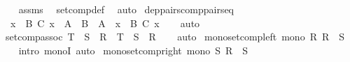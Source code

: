 \begin{isabellebody}
%
\isadelimproof
\ \ %
\endisadelimproof
%
\isatagproof
{}\isamarkupfalse%
\ assms\ \isamarkupfalse%
\ set{\isacharunderscore}{\kern0pt}comp{\isacharunderscore}{\kern0pt}def\ \isamarkupfalse%
\ auto%
\endisatagproof
{\isafoldproof}%
%
\isadelimproof
\isanewline
%
\endisadelimproof
\isanewline
{}\isamarkupfalse%
\ dep{\isacharunderscore}{\kern0pt}pairs{\isacharunderscore}{\kern0pt}comp{\isacharunderscore}{\kern0pt}pairs{\isacharunderscore}{\kern0pt}eq{\isacharcolon}{\kern0pt}\isanewline
\ \ {\isachardoublequoteopen}{\isacharparenleft}{\kern0pt}{\isacharparenleft}{\kern0pt}{\isasymSum}x\ {\isasymin}\ B{\isachardot}{\kern0pt}\ {\isacharparenleft}{\kern0pt}C\ x{\isacharparenright}{\kern0pt}{\isacharparenright}{\kern0pt}\ {\isasymcirc}\ {\isacharparenleft}{\kern0pt}A\ {\isasymtimes}\ B{\isacharparenright}{\kern0pt}{\isacharparenright}{\kern0pt}\ {\isacharequal}{\kern0pt}\ A\ {\isasymtimes}\ {\isacharparenleft}{\kern0pt}{\isasymUnion}x\ {\isasymin}\ B{\isachardot}{\kern0pt}\ {\isacharparenleft}{\kern0pt}C\ x{\isacharparenright}{\kern0pt}{\isacharparenright}{\kern0pt}{\isachardoublequoteclose}\isanewline
%
\isadelimproof
\ \ %
\endisadelimproof
%
\isatagproof
{}\isamarkupfalse%
\ auto%
\endisatagproof
{\isafoldproof}%
%
\isadelimproof
\isanewline
%
\endisadelimproof
\isanewline
{}\isamarkupfalse%
\ set{\isacharunderscore}{\kern0pt}comp{\isacharunderscore}{\kern0pt}assoc{\isacharcolon}{\kern0pt}\ {\isachardoublequoteopen}T\ {\isasymcirc}\ S\ {\isasymcirc}\ R\ {\isacharequal}{\kern0pt}\ {\isacharparenleft}{\kern0pt}T\ {\isasymcirc}\ S{\isacharparenright}{\kern0pt}\ {\isasymcirc}\ R{\isachardoublequoteclose}\isanewline
%
\isadelimproof
\ \ %
\endisadelimproof
%
\isatagproof
{}\isamarkupfalse%
\ auto%
\endisatagproof
{\isafoldproof}%
%
\isadelimproof
\isanewline
%
\endisadelimproof
\isanewline
{}\isamarkupfalse%
\ mono{\isacharunderscore}{\kern0pt}set{\isacharunderscore}{\kern0pt}comp{\isacharunderscore}{\kern0pt}left{\isacharcolon}{\kern0pt}\ {\isachardoublequoteopen}mono\ {\isacharparenleft}{\kern0pt}{\isasymlambda}R{\isachardot}{\kern0pt}\ R\ {\isasymcirc}\ S{\isacharparenright}{\kern0pt}{\isachardoublequoteclose}\isanewline
%
\isadelimproof
\ \ %
\endisadelimproof
%
\isatagproof
{}\isamarkupfalse%
\ {\isacharparenleft}{\kern0pt}intro\ monoI{\isacharparenright}{\kern0pt}\ auto%
\endisatagproof
{\isafoldproof}%
%
\isadelimproof
\isanewline
%
\endisadelimproof
\isanewline
{}\isamarkupfalse%
\ mono{\isacharunderscore}{\kern0pt}set{\isacharunderscore}{\kern0pt}comp{\isacharunderscore}{\kern0pt}right{\isacharcolon}{\kern0pt}\ {\isachardoublequoteopen}mono\ {\isacharparenleft}{\kern0pt}{\isasymlambda}S{\isachardot}{\kern0pt}\ R\ {\isasymcirc}\ S{\isacharparenright}{\kern0pt}{\isachardoublequoteclose}\isanewline

\end{isabellebody}
